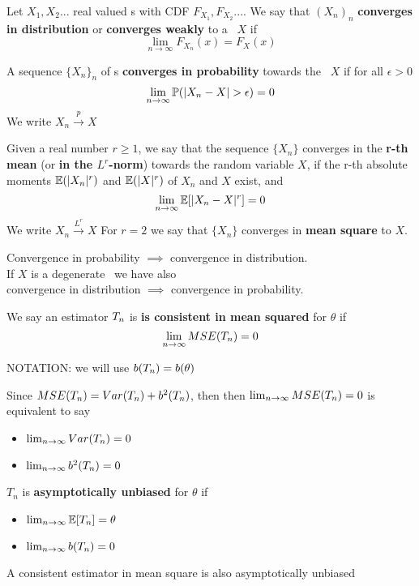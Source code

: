 \begin{defi}
	Let $X_1, X_2...$ real valued  \rv s with CDF $F_{X_1},F_{X_2}...$. We say that $(X_n)_n$ \textbf{converges in distribution} or \textbf{converges weakly} to a \rv  \  $X$ if $$\lim_{n\to \infty}F_{X_n}(x)=F_X(x)$$
\end{defi}
\begin{defi}
	A sequence $\{ X_n\}_n$ of \rv s \textbf{converges in probability} towards the \rv \ $X$ if for all $\epsilon>0$
	$$\lim_{n\to \infty}\p(|X_n-X|>\epsilon)=0$$
	We write $X_n\xrightarrow{p}X$
\end{defi}
\begin{defi}
	Given a real number $r \geq 1$, we say that the sequence $\{X_n\}$ converges in the \textbf{r-th mean} (or \textbf{in the $L^r$-norm}) towards the random variable $X$, if the r-th absolute moments $\mathbb{E}(|X_n|^r)$ and $\mathbb{E}(|X|^r)$ of $X_n$ and $X$ exist, and
	$$\lim_{n\to \infty}\mathbb{E}[|X_n-X|^r]=0$$
	We write $X_n \xrightarrow{L^r} X$
	For $r=2$ we say that $\{X_n\}$ converges in \textbf{mean square}  to $X$.
\end{defi}

\begin{prop}
	Convergence in probability $\implies$ convergence in distribution.\\
	If $X$ is a degenerate \rv \ we have also\\  convergence in distribution $\implies$ convergence in probability.
\end{prop}
\begin{defi}
	We say an estimator $T_{n}$ is \textbf{is consistent in mean squared} for $\theta$ if 
	$$\lim_{n\to \infty}MSE(T_{n})=0$$
\end{defi}
NOTATION: we will use $b(T_{n})=b(\theta)$
\begin{oss}
	Since $MSE(T_{n})=Var(T_n)+b^2(T_{n})$, then then $\lim_{n\to \infty}MSE(T_{n})=0$ is equivalent to say
	\begin{itemize}
		\item  $\lim_{n\to \infty}Var(T_{n})=0$
		\item $\lim_{n\to \infty}b^2(T_{n})=0$
	\end{itemize}
\end{oss}
\begin{defi}
	$T_n$ is \textbf{asymptotically unbiased} for $\theta$ if
	\begin{itemize}
		\item $\lim_{n\to \infty}\mathbb{E}[T_{n}]=\theta$
		\item $\lim_{n\to \infty}b(T_{n})=0$
	\end{itemize}
\end{defi}
\begin{prop}
	A consistent estimator in mean square is also asymptotically unbiased
\end{prop}

